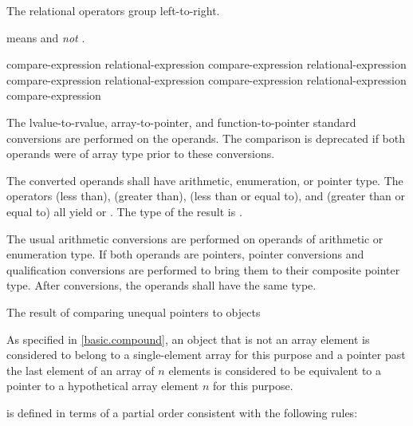 \pnum
The relational operators group left-to-right.
\begin{example}
 means  and \emph{not}
.
\end{example}
%
%
%
%
%
%
%
%
%
\begin{bnf}
\br
    compare-expression\br
    relational-expression \terminal{<} compare-expression\br
    relational-expression \terminal{>} compare-expression\br
    relational-expression \terminal{<=} compare-expression\br
    relational-expression \terminal{>=} compare-expression
\end{bnf}
%
The
lvalue-to-rvalue,
array-to-pointer,
and function-to-pointer
standard conversions are performed on the operands.
The comparison is deprecated if
both operands were of array type
prior to these conversions.

\pnum
The converted operands shall have arithmetic, enumeration, or pointer type.
The
operators \tcode{<} (less than), \tcode{>} (greater than), \tcode{<=}
(less than or equal to), and \tcode{>=} (greater than or equal to) all
yield  or . The type of the result is
.

\pnum
The usual arithmetic conversions are performed on operands of arithmetic
or enumeration type. If both operands are pointers, pointer
conversions and qualification conversions
are performed to bring
them to their composite pointer type.
After conversions, the operands shall have the same type.

\pnum
The result of comparing unequal pointers to objects
\begin{footnote}
As specified in \ref{basic.compound},
an object that is not an array element
is considered to belong to a
single-element array for this purpose and
a pointer past the last element of an array of $n$ elements
is considered to be equivalent to a pointer to a hypothetical array element
$n$ for this purpose.
\end{footnote}
is defined in terms of a partial order consistent with the following rules:


